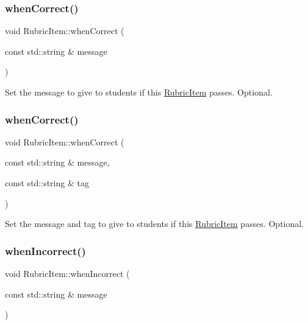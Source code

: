 \subsubsection{\texorpdfstring{when\+Correct()}{whenCorrect()}\hspace{0.1cm}{\footnotesize\ttfamily [1/2]}}
{\footnotesize\ttfamily void Rubric\+Item\+::when\+Correct (\begin{DoxyParamCaption}\item[{const std\+::string \&}]{message }\end{DoxyParamCaption})}

Set the message to give to students if this \hyperlink{class_rubric_item}{Rubric\+Item} passes. Optional. \hypertarget{class_rubric_item_aeb48935d288d2c6b0ea43e97b51b0d72}{}\label{class_rubric_item_aeb48935d288d2c6b0ea43e97b51b0d72} 
\subsubsection{\texorpdfstring{when\+Correct()}{whenCorrect()}\hspace{0.1cm}{\footnotesize\ttfamily [2/2]}}
{\footnotesize\ttfamily void Rubric\+Item\+::when\+Correct (\begin{DoxyParamCaption}\item[{const std\+::string \&}]{message,  }\item[{const std\+::string \&}]{tag }\end{DoxyParamCaption})}

Set the message and tag to give to students if this \hyperlink{class_rubric_item}{Rubric\+Item} passes. Optional. \hypertarget{class_rubric_item_a76e977dea00f6bb3512e4f6538e6354f}{}\label{class_rubric_item_a76e977dea00f6bb3512e4f6538e6354f} 
\subsubsection{\texorpdfstring{when\+Incorrect()}{whenIncorrect()}\hspace{0.1cm}{\footnotesize\ttfamily [1/2]}}
{\footnotesize\ttfamily void Rubric\+Item\+::when\+Incorrect (\begin{DoxyParamCaption}\item[{const std\+::string \&}]{message }\end{DoxyParamCaption})}

